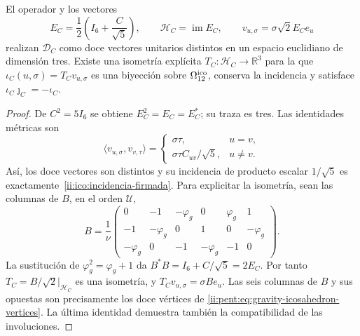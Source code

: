 \begin{samepage}
\begin{proposition}
\label{ii:ico:realizacion-firmada}
El operador y los vectores
\begin{equation}
 E_C=\frac12\left(I_6+\frac C{\sqrt5}\right),\qquad
 \mathcal H_C=\operatorname{im}E_C,\qquad
 v_{u,\sigma}=\sigma\sqrt2 E_Ce_u
 \label{ii:ico:proyector-seis}
\end{equation}
realizan \(\mathcal D_C\) como doce vectores unitarios distintos en un
espacio euclidiano de dimensión tres. Existe una isometría explícita
\(T_C:\mathcal H_C\to\mathbb R^3\) para la que
\(\iota_C(u,\sigma)=T_Cv_{u,\sigma}\) es una biyección sobre
\(\Omega_{12}^{\rm ico}\), conserva la incidencia y satisface
\(\iota_C\jmath_C=-\iota_C\).
\end{proposition}
\end{samepage}
\begin{proof}
De \(C^2=5I_6\) se obtiene \(E_C^2=E_C=E_C^*\); su traza es tres.
Las identidades métricas son
\[
 \langle v_{u,\sigma},v_{v,\tau}\rangle
 =\begin{cases}\sigma\tau,&u=v,\\
 \sigma\tau C_{uv}/\sqrt5,&u\ne v.
 \end{cases}
\]
Así, los doce vectores son distintos y su incidencia de producto escalar
\(1/\sqrt5\) es exactamente~\eqref{ii:ico:incidencia-firmada}.
Para explicitar la isometría, sean las columnas de \(B\), en el orden
\(\mathcal U\),
\[
 B=\frac1\nu
 \begin{pmatrix}
 0&-1&-\varphi_g&0&\varphi_g&1\\
 -1&-\varphi_g&0&1&0&-\varphi_g\\
 -\varphi_g&0&-1&-\varphi_g&-1&0
 \end{pmatrix}.
\]
La sustitución de \(\varphi_g^2=\varphi_g+1\) da
\(B^*B=I_6+C/\sqrt5=2E_C\). Por tanto
\(T_C=B/\sqrt2\big|_{\mathcal H_C}\) es una isometría, y
\(T_Cv_{u,\sigma}=\sigma Be_u\). Las seis columnas de \(B\) y sus
opuestas son precisamente los doce vértices de
\eqref{ii:pent:eq:gravity-icosahedron-vertices}. La última identidad
demuestra también la compatibilidad de las involuciones.
\end{proof}

